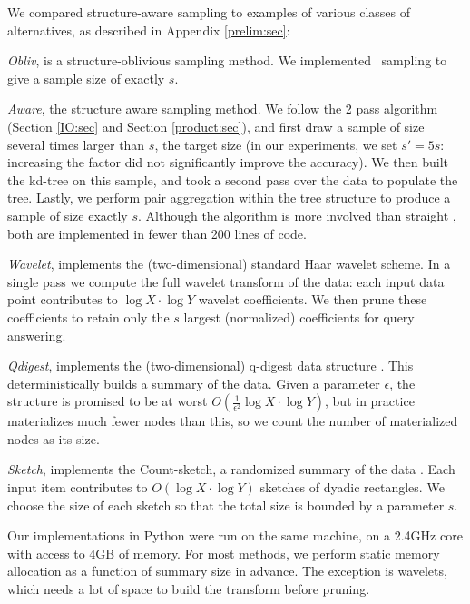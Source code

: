 \documentclass[11pt]{article}
\newcommand{\para}[1]{\medskip \noindent {\bf #1}}
\begin{document}
\para{Methods.}
We compared  structure-aware sampling  to examples of various
classes of alternatives, as described in Appendix \ref{prelim:sec}:


\begin{trivlist}
\item
{\em Obliv}, is a structure-oblivious sampling method. 
We implemented \varopt\ sampling
to give a sample size of exactly $s$.

\item
 {\em Aware}, the structure aware sampling method. 
 We follow the 2 pass algorithm (Section \ref{IO:sec} and
Section \ref{product:sec}), and first
 draw a sample of size several times larger than $s$, the target
 size (in our experiments, we set $s'= 5s$: increasing the
 factor did not significantly improve the accuracy).
 We then built the kd-tree on this sample, and took a second pass over
 the data to populate the tree.  
 Lastly, we perform pair aggregation within the tree structure to
 produce a sample of size exactly $s$. 
Although the algorithm is more involved than straight \varopt, 
 both are implemented in fewer than 200 lines of code.

\item
{\em Wavelet}, implements the (two-dimensional) standard Haar wavelet scheme.  
In a single pass we compute the full wavelet transform of the data:
each input data point contributes to $\log X \cdot \log Y$ wavelet
coefficients. 
We then prune these coefficients to retain only the $s$ largest
(normalized) coefficients for query answering. 
\item
{\em Qdigest}, implements the (two-dimensional) q-digest data
structure \cite{HSST:ISAAC04}.
This deterministically builds a summary of the data. 
Given a parameter $\epsilon$, the structure is promised to be at worst 
$O(\frac{1}{\epsilon^2}\log X \cdot \log Y)$, but in practice
materializes much fewer nodes than this, so we count the number of
materialized nodes as its size.
\item
{\em Sketch}, implements the Count-sketch, a randomized summary of the
data \cite{ccf:icalp2002}. 
Each input item contributes to $O(\log X \cdot \log Y)$ sketches of
dyadic rectangles.  
We choose the size of each sketch so that the total size is bounded by 
a parameter $s$. 
\end{trivlist}

Our implementations in Python were run on the same machine, on a 2.4GHz core
with access to 4GB of memory. 
For most methods, we perform static memory allocation as a function of
summary size in advance. 
The exception is wavelets, which needs a lot of space to build the
transform before pruning. 
\end{document}
